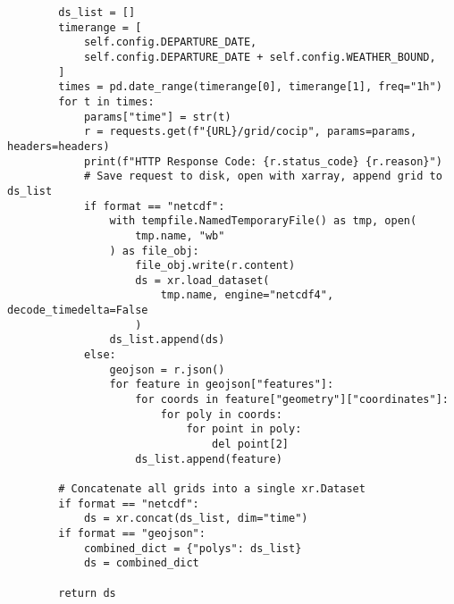 \begin{verbatim}
        ds_list = []
        timerange = [
            self.config.DEPARTURE_DATE,
            self.config.DEPARTURE_DATE + self.config.WEATHER_BOUND,
        ]
        times = pd.date_range(timerange[0], timerange[1], freq="1h")
        for t in times:
            params["time"] = str(t)
            r = requests.get(f"{URL}/grid/cocip", params=params, headers=headers)
            print(f"HTTP Response Code: {r.status_code} {r.reason}")
            # Save request to disk, open with xarray, append grid to ds_list
            if format == "netcdf":
                with tempfile.NamedTemporaryFile() as tmp, open(
                    tmp.name, "wb"
                ) as file_obj:
                    file_obj.write(r.content)
                    ds = xr.load_dataset(
                        tmp.name, engine="netcdf4", decode_timedelta=False
                    )
                ds_list.append(ds)
            else:
                geojson = r.json()
                for feature in geojson["features"]:
                    for coords in feature["geometry"]["coordinates"]:
                        for poly in coords:
                            for point in poly:
                                del point[2]
                    ds_list.append(feature)

        # Concatenate all grids into a single xr.Dataset
        if format == "netcdf":
            ds = xr.concat(ds_list, dim="time")
        if format == "geojson":
            combined_dict = {"polys": ds_list}
            ds = combined_dict

        return ds

\end{verbatim}
